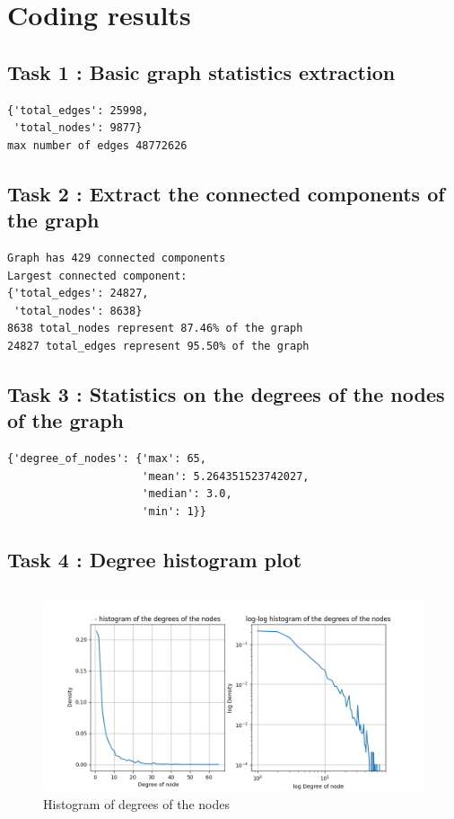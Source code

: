 \documentclass[a4paper]{article}
\begin{document}


\section*{Coding results}

\subsection*{Task 1 : Basic graph statistics extraction}
\begin{verbatim}
{'total_edges': 25998,
 'total_nodes': 9877}
max number of edges 48772626
\end{verbatim}


\subsection*{Task 2 : Extract the connected components of the graph}
\begin{verbatim}
Graph has 429 connected components
Largest connected component:
{'total_edges': 24827,
 'total_nodes': 8638}
8638 total_nodes represent 87.46% of the graph
24827 total_edges represent 95.50% of the graph
\end{verbatim}


\subsection*{Task 3 : Statistics on the degrees of the nodes of the graph}
\begin{verbatim}
{'degree_of_nodes': {'max': 65,
                     'mean': 5.264351523742027,
                     'median': 3.0,
                     'min': 1}}
\end{verbatim}


\subsection*{Task 4 : Degree histogram plot}
\begin{verbatim}
\end{verbatim}\begin{figure}[ht]
        \centering
        \includegraphics[width=.6\textwidth]{figures/histogram_degree_of_nodes.png}
        \caption{Histogram of degrees of the nodes}
\end{figure}
\begin{verbatim}
\end{verbatim}
\end{document}
